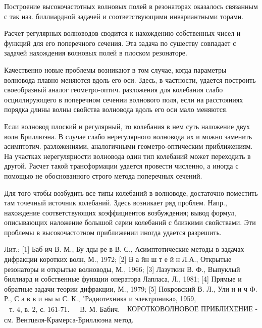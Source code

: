 \documentclass[10pt]{article}
\begin{document}
Построение высокочастотных волновых полей в резонаторах оказалось связанным с так наз. биллиардной задачей и соответствующими инвариантными торами.



Расчет регулярных волноводов сводится к нахождению собственных чисел и функций для его поперечного сечения. Эта задача по сушеству совпадает с задачей нахождения волновых полей в плоском резонаторе.



Качественно новые проблемы возникают в том случае, когда параметры волновода плавно меняются вдоль его оси. Здесь, в частности, удается построить своеобразный аналог геометро-оптич. разложения для колебания слабо осциллирующего в поперечном сечении волнового поля, если на расстояниях порядка длины волны свойства волновода вдоль его оси мало меняются.



Если волновод плоский и регулярный, то колебания в нем суть наложение двух волн Бриллюэна. В случае слабо нерегулярного волновода их и можно заменить асимптотич. разложениями, аналогичными геометро-оптическим приближениям. На участках нерегулярности волновода один тип колебаний может переходить в другой. Расчет такой трансформации удается провести численно, а иногда с помощью не обоснованного строго метода поперечных сечений.



Для того чтобы возбудить все типы колебаний в волноводе, достаточно поместить там точечный источник колебаний. Здесь возникает ряд проблем. Напр., нахождение соответствующих коэффициентов возбуждения; вывод формул, описывающих наложение болышой серии колебаний с близкими свойствами. Эти проблемы в высокочастотном приближении иногда удается разрешить.



Лит.: [1] Баб ич В. М., Бу лды ре в В. С., Асимптотические методы в задачах дифракции коротких волн, М., 1972; [2] В а йн ш т е й н Л.А., Открытые резонаторы и открытые волноводы, М., 1966; [3] Лазуткин В. Ф., Выпуклый биллиард и собственные функции оператора Лапласа, Л., 1981; [4] Прямые и обратные задачи теории дифракции, М., 1979; [5] Покровский В. Л., Ули н и ч Ф. Р., С а в в и ны ы С. К., "Радиотехника и электроника», 1959, $\begin{array}{ll}\text { т. 4, в. 2, с. 161-71. } & \text { B. М. Бабич. }\end{array}$ КОРОТКОВОЛНОВОЕ ПРИБЛИХЕНИЕ - см. Вентцеля-Крамерса-Бриллюэна метод.
\end{document}

